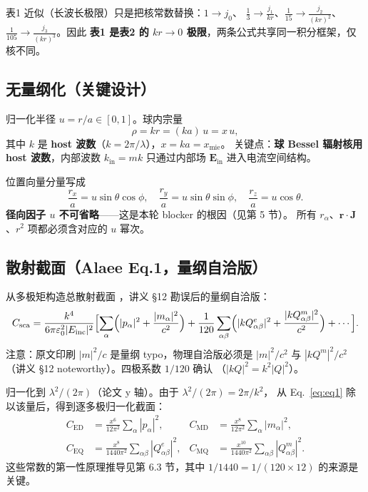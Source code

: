 表1 近似（长波长极限）只是把核常数替换：$1\to j_0$、
$\tfrac13\to\tfrac{j_1}{kr}$、$\tfrac1{15}\to\tfrac{j_2}{(kr)^2}$、
$\tfrac1{105}\to\tfrac{j_3}{(kr)^3}$。因此
\textbf{表1 是表2 的 $kr\to0$ 极限}，两条公式共享同一积分框架，仅核不同。

\subsection{无量纲化（关键设计）}

归一化半径 $u=r/a\in[0,1]$。球内宗量
\begin{equation}
  \rho = k r = (ka)\,u = x\,u,
  \label{eq:rho}
\end{equation}
其中 $k$ 是 \textbf{host 波数}（$k=2\pi/\lambda$），$x=ka=x_{\mathrm{mie}}$。
关键点：\textbf{球 Bessel 辐射核用 host 波数}，内部波数 $k_{\mathrm{in}}=mk$
只通过内部场 $\mathbf{E}_{\mathrm{in}}$ 进入电流空间结构。

位置向量分量写成
\begin{equation}
  \frac{r_x}{a} = u\sin\theta\cos\phi,\quad
  \frac{r_y}{a} = u\sin\theta\sin\phi,\quad
  \frac{r_z}{a} = u\cos\theta.
  \label{eq:rpos}
\end{equation}
\textbf{径向因子 $u$ 不可省略}——这是本轮 blocker 的根因（见第 5 节）。
所有 $r_\alpha$、$\mathbf{r}\cdot\mathbf{J}$、$r^2$ 项都必须含对应的 $u$ 幂次。

\subsection{散射截面（Alaee Eq.1，量纲自洽版）}

从多极矩构造总散射截面 \cite{Alaee2018}，讲义 §12 勘误后的量纲自洽版：
\begin{equation}
  C_{\mathrm{sca}} = \frac{k^4}{6\pi\varepsilon_0^2|E_{\mathrm{inc}}|^2}\Bigl[
    \sum_\alpha\Bigl(|p_\alpha|^2 + \frac{|m_\alpha|^2}{c^2}\Bigr)
    + \frac{1}{120}\sum_{\alpha\beta}\Bigl(
      |kQ^e_{\alpha\beta}|^2 + \frac{|kQ^m_{\alpha\beta}|^2}{c^2}\Bigr) + \cdots
  \Bigr].
  \label{eq:eq1}
\end{equation}
注意：原文印刷 $|m|^2/c$ 是量纲 typo，物理自洽版必须是 $|m|^2/c^2$
与 $|kQ^m|^2/c^2$（讲义 §12 noteworthy）。四极系数 $1/120$ 确认
（$|kQ|^2=k^2|Q|^2$）。

归一化到 $\lambda^2/(2\pi)$（论文 y 轴）。由于 $\lambda^2/(2\pi)=2\pi/k^2$，
从 Eq.~\eqref{eq:eq1} 除以该量后，得到逐多极归一化截面：
\begin{align}
  C_{\mathrm{ED}} &= \frac{x^6}{12\pi^2}\sum_\alpha|p_\alpha|^2, &
  C_{\mathrm{MD}} &= \frac{x^8}{12\pi^2}\sum_\alpha|m_\alpha|^2, \label{eq:c_ed_md}\\
  C_{\mathrm{EQ}} &= \frac{x^8}{1440\pi^2}\sum_{\alpha\beta}|Q^e_{\alpha\beta}|^2, &
  C_{\mathrm{MQ}} &= \frac{x^{10}}{1440\pi^2}\sum_{\alpha\beta}|Q^m_{\alpha\beta}|^2. \label{eq:c_eq_mq}
\end{align}
这些常数的第一性原理推导见第 6.3 节，其中
$1/1440 = 1/(120\times 12)$ 的来源是关键。

